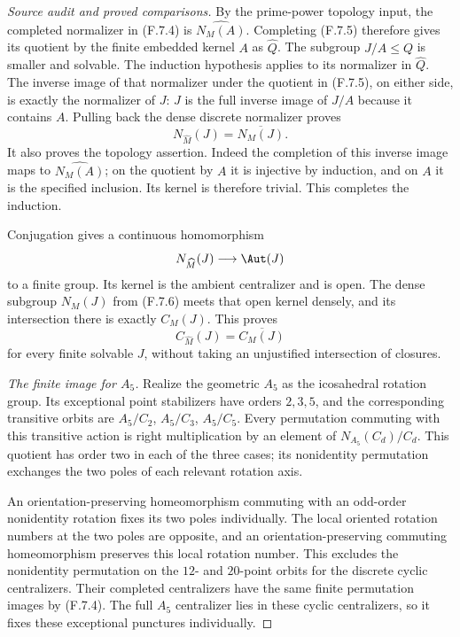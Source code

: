 \begin{proof}[Source audit and proved comparisons]
By the prime-power topology input, the completed
normalizer in (F.7.4) is $\widehat{N_M(A)}$.
Completing (F.7.5) therefore gives its quotient by
the finite embedded kernel $A$ as $\widehat Q$.
The subgroup $J/A\le Q$ is smaller and solvable.
The induction hypothesis applies to its normalizer
in $\widehat Q$. The inverse image of that normalizer
under the quotient in (F.7.5), on either side, is
exactly the normalizer of $J$: $J$ is the full inverse
image of $J/A$ because it contains $A$. Pulling back
the dense discrete normalizer proves
\[
                  N_{\widehat M}(J)=\overline{N_M(J)}.
                                                               \tag{F.7.6}
\]
It also proves the topology assertion. Indeed the
completion of this inverse image maps to
$\widehat{N_M(A)}$; on the quotient by $A$ it is
injective by induction, and on $A$ it is the specified
inclusion. Its kernel is therefore trivial.
This completes the induction.

Conjugation gives a continuous homomorphism
\[
       N_{\widehat M}(J)\longrightarrow\Aut(J)
\]
to a finite group. Its kernel is the ambient centralizer
and is open. The dense subgroup $N_M(J)$ from (F.7.6)
meets that open kernel densely, and its intersection
there is exactly $C_M(J)$. This proves
\[
                  C_{\widehat M}(J)=\overline{C_M(J)}
\]
for every finite solvable $J$, without taking an
unjustified intersection of closures.

\emph{The finite image for $A_5$.}
Realize the geometric $A_5$ as the icosahedral rotation
group. Its exceptional point stabilizers have orders
$2,3,5$, and the corresponding transitive orbits are
$A_5/C_2$, $A_5/C_3$, $A_5/C_5$. Every permutation
commuting with this transitive action is right
multiplication by an element of $N_{A_5}(C_d)/C_d$.
This quotient has order two in each of the three
cases; its nonidentity permutation exchanges the
two poles of each relevant rotation axis.

An orientation-preserving homeomorphism commuting
with an odd-order nonidentity rotation fixes its
two poles individually. The local oriented rotation
numbers at the two poles are opposite, and an
orientation-preserving commuting homeomorphism
preserves this local rotation number. This excludes
the nonidentity permutation on the $12$- and
$20$-point orbits for the discrete cyclic centralizers.
Their completed centralizers have the same finite
permutation images by (F.7.4). The full $A_5$
centralizer lies in these cyclic centralizers, so
it fixes these exceptional punctures individually.


\end{proof}
